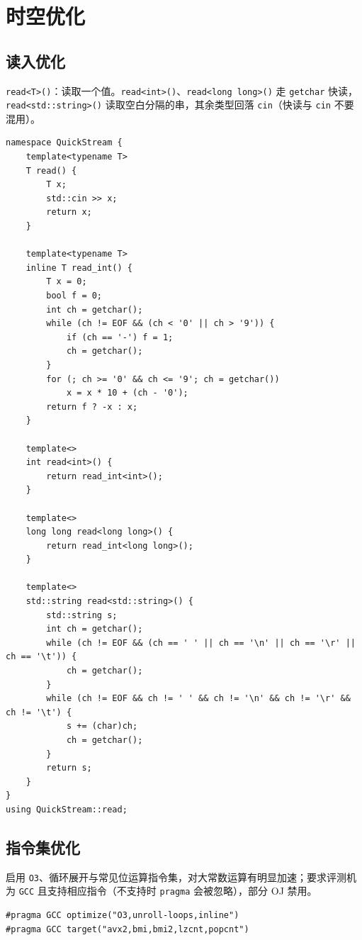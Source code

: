 \section{时空优化}

\subsection{读入优化}

\verb|read<T>()|：读取一个值。\verb|read<int>()|、\verb|read<long long>()| 走 \texttt{getchar} 快读，\verb|read<std::string>()| 读取空白分隔的串，其余类型回落 \texttt{cin}（快读与 \texttt{cin} 不要混用）。

\begin{lstlisting}
namespace QuickStream {
    template<typename T>
    T read() {
        T x;
        std::cin >> x;
        return x;
    }

    template<typename T>
    inline T read_int() {
        T x = 0;
        bool f = 0;
        int ch = getchar();
        while (ch != EOF && (ch < '0' || ch > '9')) {
            if (ch == '-') f = 1;
            ch = getchar();
        }
        for (; ch >= '0' && ch <= '9'; ch = getchar())
            x = x * 10 + (ch - '0');
        return f ? -x : x;
    }

    template<>
    int read<int>() {
        return read_int<int>();
    }

    template<>
    long long read<long long>() {
        return read_int<long long>();
    }

    template<>
    std::string read<std::string>() {
        std::string s;
        int ch = getchar();
        while (ch != EOF && (ch == ' ' || ch == '\n' || ch == '\r' || ch == '\t')) {
            ch = getchar();
        }
        while (ch != EOF && ch != ' ' && ch != '\n' && ch != '\r' && ch != '\t') {
            s += (char)ch;
            ch = getchar();
        }
        return s;
    }
}
using QuickStream::read;
\end{lstlisting}

\subsection{指令集优化}

启用 \texttt{O3}、循环展开与常见位运算指令集，对大常数运算有明显加速；要求评测机为 \texttt{GCC} 且支持相应指令（不支持时 \texttt{pragma} 会被忽略），部分 OJ 禁用。

\begin{lstlisting}
#pragma GCC optimize("O3,unroll-loops,inline")
#pragma GCC target("avx2,bmi,bmi2,lzcnt,popcnt")
\end{lstlisting}
